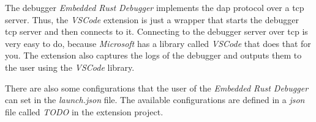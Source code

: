 The debugger \emph{Embedded Rust Debugger} implements the \gls{dap} protocol over a \gls{tcp} server.
Thus, the \emph{VSCode} extension is just a wrapper that starts the debugger \gls{tcp} server and then connects to it.
Connecting to the debugger server over \gls{tcp} is very easy to do, because \emph{Microsoft} has a library called \emph{VSCode} that does that for you.
The extension also captures the logs of the debugger and outputs them to the user using the \emph{VSCode} library.

There are also some configurations that the user of the \emph{Embedded Rust Debugger} can set in the \emph{launch.json} file.
The available configurations are defined in a \emph{json} file called \emph{TODO} in the extension project.
